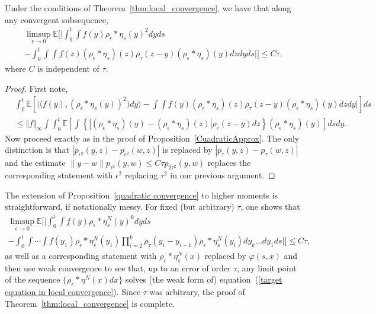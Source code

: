 \documentclass[EJP]{ejpecp} %
\newcommand{\IE}{\mathbb E}
\begin{document}
\begin{proposition}
	\label{quadratic convergence}
Under the conditions of Theorem~\ref{thm:local_convergence}, we have that
along any convergent subsequence,
\begin{multline}
\label{approx4}
\limsup_{\epsilon \to 0}
\IE\Big[\Big|
\int_0^t\int f(y) \rho_\epsilon*\eta_s(y)^2 dy ds
\\
-
\int_0^t\int \int f(z) (\rho_\epsilon * \eta_s)(z) 
\rho_\tau (z-y) (\rho_\epsilon * \eta_s)(y) dz dy ds\Big|\Big]\leq C\tau,
\end{multline}
where $C$ is independent of $\tau$.
\end{proposition}
\begin{proof}
First note,
\begin{align}
&\int_0^t 
\mathbb{E}\left[\big| \langle f(y), (\rho_\epsilon*\eta_s(y))^2) dy \rangle 
- \int \int f(y) (\rho_\epsilon * \eta_s)(z) \rho_\tau (z-y) 
(\rho_\epsilon * \eta_s)(y) dz dy \big|\right] ds 
\nonumber 
\\ 
&\leq  
\Vert f \Vert_\infty \int  \int_0^t  
\mathbb{E}\left[ \int \left\{ \left|(\rho_\epsilon * \eta_s)(y)
-(\rho_\epsilon * \eta_s)(z) \right|   \rho_\tau(z-y) dz \right\} 
(\rho_\epsilon *\eta_s)(y) \right] ds  dy. 
\label{b1}
\end{align}
Now proceed exactly as in the proof of 
Proposition~\ref{CuadraticApprox}.
The only distinction is that $|p_{\epsilon^2}(y,z)-p_{\epsilon^2}(w,z)|$
is replaced by $|p_{\tau}(y,z)-p_{\tau}(w,z)|$ and 
the estimate $\|y-w\|p_{\tau^2}(y,w)\leq C\tau p_{2\tau^2}(y,w)$
replaces the corresponding statement with $\epsilon^2$ replacing 
$\tau^2$ in our previous argument.
\end{proof}

The extension of Proposition~\ref{quadratic convergence}
to higher moments is straightforward, if notationally messy. For 
fixed (but arbitrary) $\tau$, one shows that
\begin{multline*}
	\limsup_{\epsilon\to 0}
	\IE\Big[\Big|
	\int_0^t\int f(y)\rho_\epsilon*\eta_s^N(y)^k dy ds
\\
	- \int_0^t\int\cdots\int f(y_1)
	\rho_\epsilon*\eta_s^N(y_1) 
\prod_{i=2}^{k}\rho_\tau (y_i-y_{i-1})\rho_\epsilon*\eta_s^N(y_i)
dy_{k}\ldots dy_1 ds\Big| \Big]
	\leq C\tau,
\end{multline*}
as well as a corresponding statement with $\rho_\epsilon*\eta_s^N(x)$ replaced
by $\varphi(s,x)$ and then use weak convergence to see that, up to an error 
of order $\tau$, any limit point of
the sequence $\{\rho_\epsilon*\eta^N(x)dx\}$ solves (the weak form 
of) equation~(\ref{target equation in local convergence}).
Since $\tau$ was arbitrary, the proof of Theorem~\ref{thm:local_convergence}
is complete.
\end{document}
